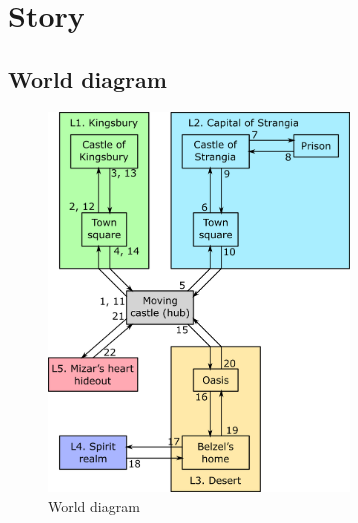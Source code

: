 \chapter{Story}






\section{World diagram}
\begin{figure}[H]
  \centering
  \includegraphics[width=8cm]{Images/worldDiagram}
  \caption{World diagram}
\end{figure}


